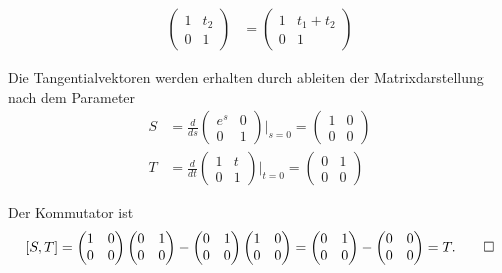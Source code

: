 \begin{loesung}
\begin{teilaufgaben}
\begin{align*}
\begin{pmatrix} 1&t_2\\0&1\end{pmatrix}
&=
\begin{pmatrix} 1&t_1+t_2\\0&1\end{pmatrix}
\end{align*}
\item
Die Tangentialvektoren werden erhalten durch ableiten der
Matrixdarstellung nach dem Parameter
\begin{align*}
S
&=
\frac{d}{ds} \begin{pmatrix}e^s&0\\0&1\end{pmatrix}\bigg|_{s=0}
=
\begin{pmatrix}1&0\\0&0\end{pmatrix}
\\
T
&=
\frac{d}{dt} \begin{pmatrix}1&t\\0&1\end{pmatrix}\bigg|_{t=0}
=
\begin{pmatrix}0&1\\0&0\end{pmatrix}
\end{align*}
\item Der Kommutator ist
\[
[S,T]
=
\begin{pmatrix}1&0\\0&0\end{pmatrix}
\begin{pmatrix}0&1\\0&0\end{pmatrix}
-
\begin{pmatrix}0&1\\0&0\end{pmatrix}
\begin{pmatrix}1&0\\0&0\end{pmatrix}
=
\begin{pmatrix}0&1\\0&0\end{pmatrix}
-
\begin{pmatrix}0&0\\0&0\end{pmatrix}
=
T.
\qedhere
\]
\end{teilaufgaben}
\end{loesung}


